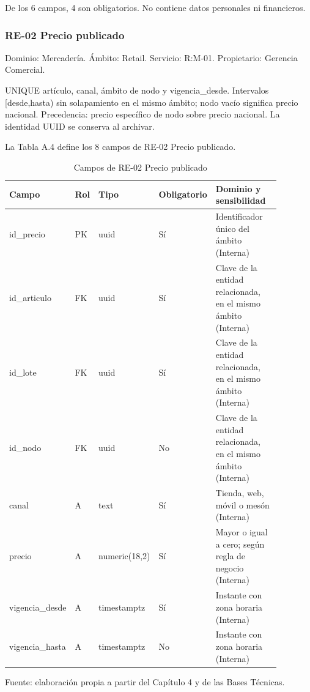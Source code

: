 \documentclass[11pt]{article}
\begin{document}
De los 6 campos, 4 son obligatorios. No contiene datos personales ni financieros.

\subsubsection{RE-02 Precio publicado}

Dominio: Mercadería. Ámbito: Retail. Servicio: R:M-01. Propietario: Gerencia Comercial.

UNIQUE artículo, canal, ámbito de nodo y vigencia\_desde. Intervalos [desde,hasta) sin solapamiento en el mismo ámbito; nodo vacío significa precio nacional. Precedencia: precio específico de nodo sobre precio nacional. La identidad UUID se conserva al archivar.

La Tabla A.4 define los 8 campos de RE-02 Precio publicado.

\begin{table}[htbp]
\caption{Campos de RE-02 Precio publicado}\label{tab:d_re02}
\centering
\begin{tabular}{@{}p{0.167\linewidth}p{0.070\linewidth}p{0.079\linewidth}p{0.097\linewidth}p{0.465\linewidth}@{}}
\toprule Campo & Rol & Tipo & Obligatorio & Dominio y sensibilidad \\
\midrule
id\_precio & PK & uuid & Sí & Identificador único del ámbito (Interna) \\
id\_articulo & FK & uuid & Sí & Clave de la entidad relacionada, en el mismo ámbito (Interna) \\
id\_lote & FK & uuid & Sí & Clave de la entidad relacionada, en el mismo ámbito (Interna) \\
id\_nodo & FK & uuid & No & Clave de la entidad relacionada, en el mismo ámbito (Interna) \\
canal & A & text & Sí & Tienda, web, móvil o mesón (Interna) \\
precio & A & numeric(18,2) & Sí & Mayor o igual a cero; según regla de negocio (Interna) \\
vigencia\_desde & A & timestamptz & Sí & Instante con zona horaria (Interna) \\
vigencia\_hasta & A & timestamptz & No & Instante con zona horaria (Interna) \\
\bottomrule
\end{tabular}
\par\smallskip
{\raggedright Fuente: elaboración propia a partir del Capítulo 4 y de las Bases Técnicas.\par}
\end{table}
\end{document}
